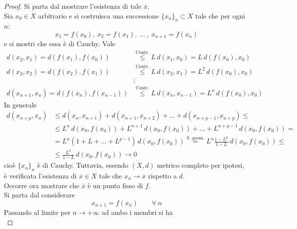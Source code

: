 \begin{proof}
    Si parta dal mostrare l'esistenza di tale $\overline{x}$.\\
    Sia $x_0 \in X$ arbitrario e si costruisca una successione $\{x_n\}_n \subset X$ tale che per ogni $n$:
    \begin{equation}
            x_1=f(x_0),\ x_2=f(x_1),\ \dots\ ,\ x_{n+1}=f(x_n)
    \end{equation}
    e si mostri che essa è di Cauchy. Vale
    \begin{equation}
    \begin{aligned}
        d(x_2, x_1)=d(f(x_1), f(x_0)) &\overset{\text{Contr.}}{\leq} L\, d(x_1, x_0) = L\, d(f(x_0), x_0)\\
        d(x_3, x_2)=d(f(x_2), f(x_1)) &\overset{\text{Contr.}}{\leq} L\, d(x_2, x_1) = L^2\,d(f(x_0), x_0)\\
        &\vdots\\
        d(x_{n+1}, x_n)= d(f(x_n), f(x_{n-1}))&\overset{\text{Contr.}}{\leq} L\, d(x_n, x_{n-1}) = L^n\,d(f(x_0), x_0)
    \end{aligned}
    \end{equation}
    In generale
    \begin{equation}
    \begin{aligned}
        d(x_{n+p}, x_n) &\leq d(x_n, x_{n+1})+ d(x_{n+1}, x_{n+2})+ \dots+ d(x_{n+p-1}, x_{n+p}) \leq\\
        &\leq L^n\,d(x_0, f(x_0))+ L^{n+1}\, d(x_0, f(x_0))+ \dots+ L^{n+p-1}\, d(x_0, f(x_0))=\\
        &=L^n(1+L+\dots+L^{p-1})\,d(x_0, f(x_0)) \overset{\text{S. geom.}}{=} L^n \frac{1-L^p}{1-L}\, d(x_0, f(x_0)) \leq\\
        &\leq \frac{L^n}{1-L}\, d(x_0, f(x_0)) \to 0
    \end{aligned}
    \end{equation}
    cioè $\{x_n\}_n$ è di Cauchy. Tuttavia, essendo $(X, d)$ metrico completo per ipotesi, è verificata l'esistenza di $\overline{x} \in X$ tale che $x_n \to \overline{x}$ rispetto a $d$.\\
    Occorre ora mostrare che $\overline{x}$ è un punto fisso di $f$.\\
    Si parta dal considerare 
    \begin{equation}
        x_{n+1}=f(x_n) \qquad \forall\ n
    \end{equation}
    Passando al limite per $n \to +\infty$ ad ambo i membri si ha
    \begin{equation}

\end{equation}
\end{proof}
